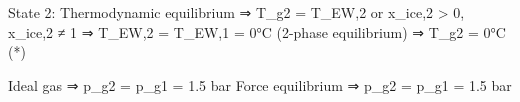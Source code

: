 State 2: Thermodynamic equilibrium  
⇒ T_g2 = T_EW,2 or x_ice,2 > 0, x_ice,2 ≠ 1  
⇒ T_EW,2 = T_EW,1 = 0°C (2-phase equilibrium)  
⇒ T_g2 = 0°C (*)  

Ideal gas ⇒ p_g2 = p_g1 = 1.5 bar  
Force equilibrium ⇒ p_g2 = p_g1 = 1.5 bar